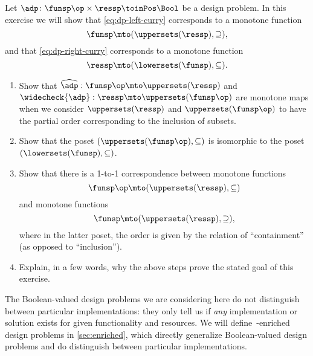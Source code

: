 \begin{gradedexercise}
Let $\adp\colon \funsp\op \times \ressp\toinPos \Bool$ be a design problem. In this exercise we will show that \cref{eq:dp-left-curry} corresponds to a monotone function
$$
\funsp \mto (\uppersets (\ressp), \supseteq),
$$
and that \cref{eq:dp-right-curry} corresponds to a monotone function
$$
\ressp \mto (\lowersets(\funsp), \subseteq).
$$

\begin{enumerate}
\item Show that $\widehat{\adp} : \funsp\op \mto \uppersets (\ressp)$ and $\widecheck{\adp} : \ressp \mto \uppersets (\funsp\op)$ are monotone maps when we consider $\uppersets (\ressp)$ and $\uppersets (\funsp\op)$ to have the partial order corresponding to the inclusion of subsets. 
\item Show that the poset $(\uppersets (\funsp\op), \subseteq)$ is isomorphic to the poset $(\lowersets(\funsp), \subseteq)$. 
\item Show that there is a 1-to-1 correspondence between monotone functions 
$$
\funsp\op \mto (\uppersets (\ressp), \subseteq)
$$
and monotone functions
$$
\funsp \mto (\uppersets (\ressp), \supseteq),
$$
where in the latter poset, the order is given by the relation of ``containment'' (as opposed to ``inclusion''). 
\item Explain, in a few words, why the above steps prove the stated goal of this exercise. 
\end{enumerate}
\end{gradedexercise}





The Boolean-valued design problems we are considering here do not distinguish between particular implementations: they only tell us if \emph{any} implementation or solution exists for given functionality and resources. We will define~\Set-enriched design problems in \cref{sec:enriched}, which directly generalize Boolean-valued design problems and do distinguish between particular implementations.

